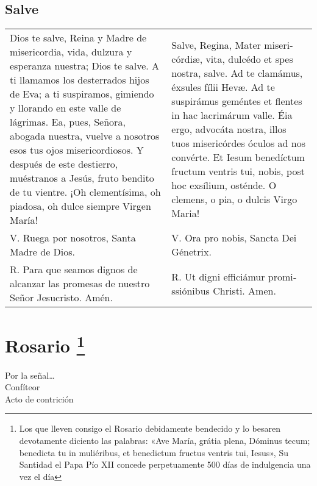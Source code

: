 \documentclass[11pt,a4paper]{book}
\begin{document}
    \section*{Salve}\label{sec:salve}
    \begin{longtable} { p{} p{} }
        Dios te salve, Reina y Madre de mi­se­ri­cordia, vida, dulzura y esperanza nuestra; Dios te salve. 
        A ti llamamos los desterrados hijos de Eva; a ti suspiramos, gimiendo y llorando en este valle de lágrimas. 
        Ea, pues, Señora, abogada nuestra, vuelve a nosotros esos tus ojos mi­se­ri­cordiosos. Y después de este destierro, muéstranos a Jesús, 
        fruto bendito de tu vientre. ¡Oh cle­men­tísima, oh piadosa, oh dulce siempre Virgen María! &
        Salve, Regina, Mater mi­se­ri­córdiæ, vita, dulcédo et spes nostra, salve. Ad te clamámus, éxsules fílii Hevæ. 
        Ad te suspirámus geméntes et flentes in hac lacrimárum valle. Éia ergo, advocáta nostra, illos tuos mi­se­ri­córdes óculos ad nos convérte. 
        Et Iesum benedíctum fructum ventris tui, nobis, post hoc exsílium, osténde. O clemens, o pia, o dulcis Virgo Maria!\\
        
        V. Ruega por nosotros, Santa Madre de Dios. & V. Ora pro nobis, Sancta Dei Génetrix.\\
        
        R. Para que seamos dignos de alcanzar las promesas de nuestro Señor Jesucristo. Amén. & 
        R. Ut digni efficiámur pro­mi­ssiónibus Christi. Amen.
    \end{longtable}

    \chapter*{Rosario \footnote{Los que lleven consigo el Rosario debidamente bendecido y lo besaren devotamente diciento las palabras:
        «Ave María, grátia plena, Dóminus tecum; benedicta tu in muliéribus, et benedictum fructus ventris tui, Iesus», Su Santidad el 
        Papa Pío XII concede perpetuamente 500 días de indulgencia una vez el día}   }

    \begin{center}
        Por la señal{\ldots}\\
        Confíteor\\
        Acto de contrición
    \end{center}
\end{document}
